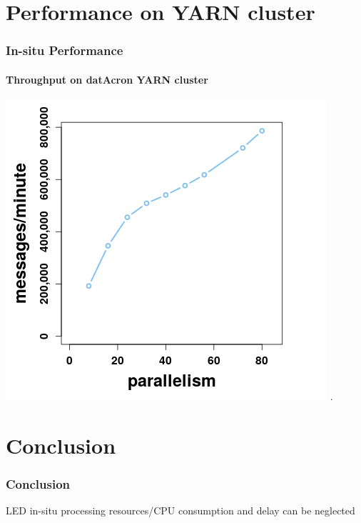 \section{Performance on YARN cluster}
\frame
{	
	\frametitle{In-situ Performance}
	\framesubtitle{Throughput on datAcron YARN cluster}
		\begin{center}
		\includegraphics[width=.95\textwidth,height=.7\linewidth]{figures/throughput.png}
		.
	\end{center}
}


\section{Conclusion}
\frame
{	\frametitle{Conclusion}
	LED in-situ processing resources/CPU consumption and delay
	can be neglected
}